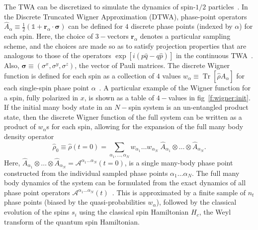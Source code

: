 \documentclass[extendedabs]{bmvc2k}
\DeclareMathOperator{\Tr}{{Tr}}
\begin{document}
The TWA can be discretized to simulate the dynamics of spin-$1/2$ particles~\cite{Wootters87}. In the Discrete Truncated Wigner Approximation (DTWA), phase-point operators $\hat{A}_\alpha\equiv \frac{1}{2}(\mathbb{1}+\bm{r}_\alpha\cdot\bm{\sigma})$ can be defined for $4$ discrete phase points (indexed by $\alpha$) for each spin. Here, the choice of $3-$vectors $\bm{r}_\alpha$ denotes a particular sampling scheme, and the choices are made so as to satisfy projection properties that are analogous to those of the operators $\exp{\left[i\left(p\hat{q}-q\hat{p}\right)\right]}$ in the continuous TWA~\cite{Schachenmaye15}. Also, $\bm{\sigma}\equiv(\sigma^x, \sigma^y,\sigma^z)$, the vector of Pauli matrices. The discrete Wigner function is defined for each spin as a collection of $4$ values  $w_\alpha\equiv \Tr{[\hat{\rho} \hat{A}_{\alpha}]}$ for each single-spin phase point $\alpha$~\cite{Schachenmaye15}. A particular example of the Wigner function for a spin, fully polarized in $x$, is shown as a table of $4-$values in fig~\ref{f:wigner:init}. If the initial many body state in an $N-$spin system is an un-entangled product state, then the discrete Wigner function of the full system can be written as a product of $w_\alpha$s for each spin, allowing for the expansion of the full many body density operator
\begin{equation}
\hat{\rho}_0\equiv \hat{\rho}(t=0) = \displaystyle\sum_{\alpha_1,\dots,\alpha_N} w_{\alpha_1}\dots w_{\alpha_N}\; \hat{A}_{\alpha_1}\otimes \dots \otimes \hat{A}_{\alpha_N}.
\end{equation}
Here, $\hat{A}_{\alpha_1}\otimes \dots \otimes \hat{A}_{\alpha_N} = \mathscr{A}^{\alpha_1\dots\alpha_N}(t=0)$, is a single many-body phase point constructed from the individual sampled phase points $\alpha_1\dots\alpha_N$. The full many body dynamics of the system can be formulated from the exact dynamics of all phase point operators $\mathscr{A}^{\alpha_1\dots\alpha_N}(t)$~\cite{Pucci16}. This is approximated by a finite sample of $n_t$ phase points (biased by the quasi-probabilities $w_\alpha$), followed by the classical evolution of the spins $s_i$ using the classical spin Hamiltonian $H_c$, the Weyl transform of the quantum spin Hamiltonian.
\end{document}

